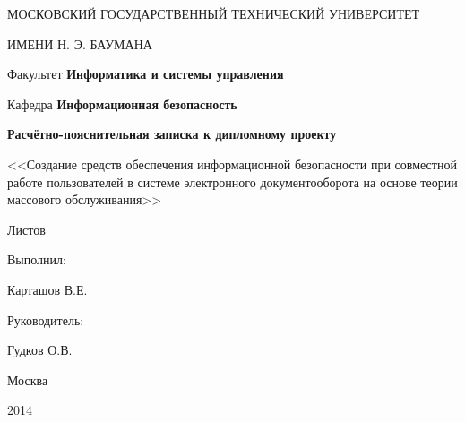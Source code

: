 \thispagestyle{empty}

\begin{center}
МОСКОВСКИЙ ГОСУДАРСТВЕННЫЙ ТЕХНИЧЕСКИЙ УНИВЕРСИТЕТ\par
ИМЕНИ Н. Э. БАУМАНА\par 
\par
Факультет \textbf{Информатика и системы управления}\par Кафедра \textbf{Информационная безопасность}
\end{center}

\vspace{20mm}


\vspace{30mm}

\vspace{5mm}
\begin{center}
{\bf \large Расчётно-пояснительная записка к дипломному проекту
\par}



\vspace{10mm}
<<Создание средств обеспечения информационной безопасности при совместной работе пользователей в системе электронного документооборота на основе теории массового обслуживания>>

\vspace{10mm}
{%
Листов \pageref*{LastPage}
}
\end{center}

\vspace{20mm}
\begin{flushright}
Выполнил:

Карташов В.Е.

\end{flushright}

\vspace{10mm}
\begin{flushright}
Руководитель:

Гудков О.В.

\end{flushright}

\vspace{40mm}
\begin{center}
{Москва

2014}
\end{center}

\newpage
